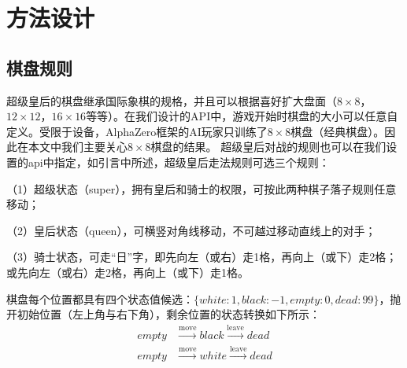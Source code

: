 \chapter{方法设计}
\label{chap:algorithm}

\section{棋盘规则}
超级皇后的棋盘继承国际象棋的规格，并且可以根据喜好扩大盘面（$8\times8$，$12\times12$，$16\times16$等等）。在我们设计的API中，游戏开始时棋盘的大小可以任意自定义。受限于设备，AlphaZero框架的AI玩家只训练了$8\times8$棋盘（经典棋盘）。因此在本文中我们主要关心$8\times8$棋盘的结果。
超级皇后对战的规则也可以在我们设置的api中指定，如引言中所述，超级皇后走法规则可选三个规则：

（1）超级状态（super），拥有皇后和骑士的权限，可按此两种棋子落子规则任意移动；

（2）皇后状态（queen），可横竖对角线移动，不可越过移动直线上的对手；

（3）骑士状态，可走“日”字，即先向左（或右）走1格，再向上（或下）走2格；或先向左（或右）走2格，再向上（或下）走1格。

棋盘每个位置都具有四个状态值候选：$\{white:1, black:-1,empty:0,dead:99\}$，抛开初始位置（左上角与右下角），剩余位置的状态转换如下所示：
\begin{equation}
    \begin{aligned}
    empty &\stackrel{\mathrm{move}}{\longrightarrow} black \stackrel{\mathrm{leave}}{\longrightarrow} dead \\
    empty &\stackrel{\mathrm{move}}{\longrightarrow} white \stackrel{\mathrm{leave}}{\longrightarrow} dead 
    \end{aligned}
\end{equation}

